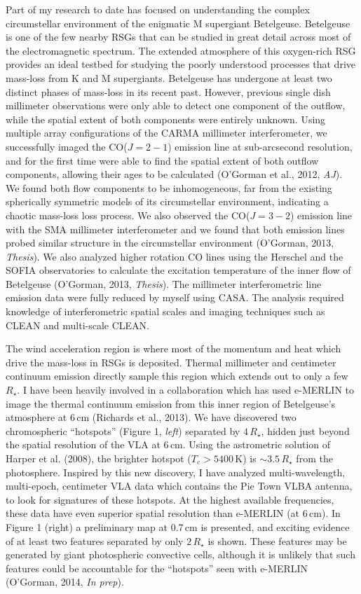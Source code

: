 \documentclass[11pt]{letter} %
\begin{document}
Part of my research to date has focused on understanding the complex circumstellar environment of the enigmatic M supergiant Betelgeuse. Betelgeuse is one of the few nearby RSGs that can be studied in great detail across most of the electromagnetic spectrum. The extended atmosphere of this oxygen-rich RSG provides an ideal testbed for studying the poorly understood processes that drive mass-loss from K and M supergiants. Betelgeuse has undergone at least two distinct phases of mass-loss in its recent past. However, previous single dish millimeter observations were only able to detect one component of the outflow, while the spatial extent of both components were entirely unknown. Using multiple array configurations of the CARMA millimeter interferometer, we successfully imaged the CO($J = 2 - 1$) emission line at sub-arcsecond resolution, and for the first time were able to find the spatial extent of both outflow components, allowing their ages to be calculated (O'Gorman et al., 2012, \textit{AJ}). We found both flow components to be inhomogeneous, far from the existing spherically symmetric models of its circumstellar environment, indicating a chaotic mass-loss loss process. We also observed  the CO($J = 3 - 2$) emission line with the SMA millimeter interferometer and we found that both emission lines probed similar structure in the circumstellar environment (O'Gorman, 2013, \textit{Thesis}). We also analyzed higher rotation CO lines using the Herschel and the SOFIA observatories to calculate the excitation temperature of the inner flow of Betelgeuse (O'Gorman, 2013, \textit{Thesis}). The millimeter interferometric line emission data were fully reduced by myself using CASA. The analysis required knowledge of interferometric spatial scales and imaging techniques such as CLEAN and multi-scale CLEAN. 

The wind acceleration region is where most of the momentum and heat which drive the mass-loss in RSGs is deposited. Thermal millimeter and centimeter continuum emission directly sample this region which extends out to only a few $R_{\star}$. I have been heavily involved in a collaboration which has used e-MERLIN to image the thermal continuum emission from this inner region of Betelgeuse's atmosphere at 6\,cm (Richards et al., 2013). We have discovered two chromospheric ``hotspots'' (Figure 1, \textit{left}) separated by $4\,R_{\star}$, hidden just beyond the spatial resolution of the VLA at 6\,cm. Using the astrometric solution of Harper et al. (2008), the brighter hotspot ($T_{e} > 5400$\,K) is $\sim 3.5\,R_{\star}$ from the photosphere. Inspired by this new discovery, I have analyzed multi-wavelength, multi-epoch, centimeter VLA data which contains the Pie Town VLBA antenna, to look for signatures of these hotspots. At the highest available frequencies, these data have even superior spatial resolution than e-MERLIN (at 6\,cm).  In Figure 1 (right) a preliminary map at 0.7\,cm is presented, and exciting evidence of at least two features separated by only $2\,R_{\star}$ is shown. These features may be generated by  giant photospheric convective cells, although it is unlikely that such features could be accountable for the ``hotspots'' seen with e-MERLIN (O'Gorman, 2014, \textit{In prep}).
\end{document}
